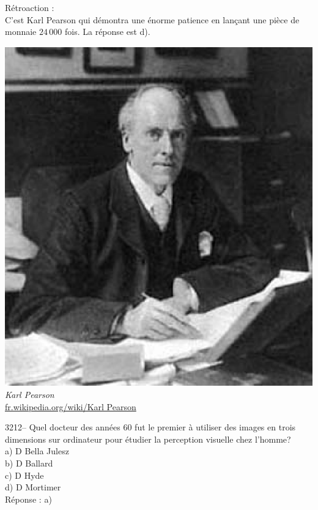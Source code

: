 \documentclass[letterpaper, 12pt]{article}
\begin{document}
R\'etroaction :\\
C'est Karl Pearson qui d\'emontra une \'enorme patience en lan\c cant une pi\`ece de monnaie $24\,000$ fois. La r\'eponse est d).
\begin{center}
\includegraphics[scale=0.35]{Pearson.eps}\\
\emph{{\small Karl Pearson}}\\
\href{http://fr.wikipedia.org/wiki/Karl_Pearson}{fr.wikipedia.org/wiki/Karl Pearson}\\[5mm]
\end{center}



3212-- Quel docteur des ann\'ees 60 fut le premier \`a utiliser des images en trois dimensions sur ordinateur pour \'etudier la perception visuelle chez l'homme?\\

a) D Bella Julesz\\
b) D Ballard\\
c) D Hyde\\
d) D Mortimer\\

R\'eponse : a)\\
\end{document}
